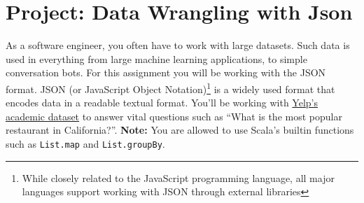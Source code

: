 \documentclass[9pt]{extbook}
\begin{document}





















\chapter{Project: Data Wrangling with Json}

\noindent As a software engineer, you often have to work with large datasets.
Such data is used in everything from large machine learning applications, to
simple conversation bots. For this assignment you will be working
with the JSON format. JSON (or JavaScript Object Notation)\footnote{While
closely related to the JavaScript programming language, all major languages
support working with JSON through external libraries} is a widely used format
that encodes data in a readable textual format. You'll be working with
\href{https://www.yelp.com/dataset}{Yelp's academic dataset} to answer vital
questions such as ``What is the most popular restaurant in California?''.
\textbf{Note:} You are allowed to use Scala's builtin functions such as
\verb|List.map| and \verb|List.groupBy|.
\end{document}
